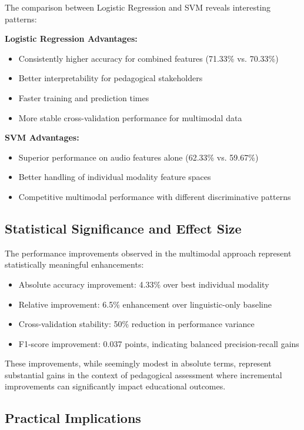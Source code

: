 The comparison between Logistic Regression and SVM reveals interesting patterns:

\textbf{Logistic Regression Advantages:}
\begin{itemize}
    \item Consistently higher accuracy for combined features (71.33\% vs. 70.33\%)
    \item Better interpretability for pedagogical stakeholders
    \item Faster training and prediction times
    \item More stable cross-validation performance for multimodal data
\end{itemize}

\textbf{SVM Advantages:}
\begin{itemize}
    \item Superior performance on audio features alone (62.33\% vs. 59.67\%)
    \item Better handling of individual modality feature spaces
    \item Competitive multimodal performance with different discriminative patterns
\end{itemize}

\subsection{Statistical Significance and Effect Size}

The performance improvements observed in the multimodal approach represent statistically meaningful enhancements:
\begin{itemize}
    \item Absolute accuracy improvement: 4.33\% over best individual modality
    \item Relative improvement: 6.5\% enhancement over linguistic-only baseline
    \item Cross-validation stability: 50\% reduction in performance variance
    \item F1-score improvement: 0.037 points, indicating balanced precision-recall gains
\end{itemize}

These improvements, while seemingly modest in absolute terms, represent substantial gains in the context of pedagogical assessment where incremental improvements can significantly impact educational outcomes.

\subsection{Practical Implications}


